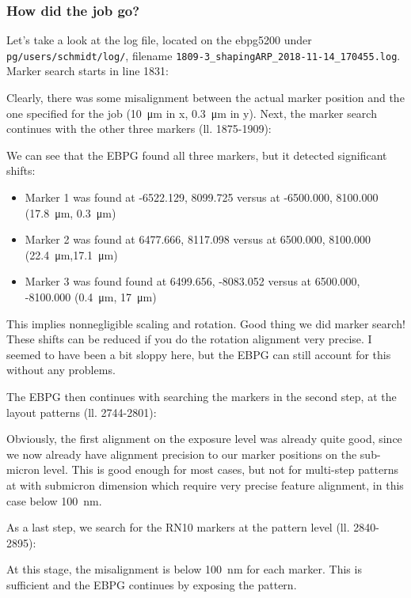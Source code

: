 \subsubsection{How did the job go?}
Let's take a look at the log file, located on the ebpg5200 under \texttt{pg/users/schmidt/log/}, filename \texttt{1809-3\_shapingARP\_2018-11-14\_170455.log}.
%
Marker search starts in line 1831:
%

%
Clearly, there was some misalignment between the actual marker position and the one specified for the job (\SI{10}{\micro\meter} in x, \SI{0.3}{\micro\meter} in y).
%
Next, the marker search continues with the other three markers (ll. 1875-1909):
%

%
We can see that the EBPG found all three markers, but it detected significant shifts:
\begin{itemize}
	\item Marker 1 was found at -6522.129, 8099.725 versus at -6500.000, 8100.000 (\SI{17.8}{\micro\meter}, \SI{0.3}{\micro\meter})
	\item Marker 2 was found at 6477.666, 8117.098 versus at 6500.000, 8100.000 (\SI{22.4}{\micro\meter},\SI{17.1}{\micro\meter})
	\item Marker 3 was found found at 6499.656, -8083.052 versus at 6500.000, -8100.000 (\SI{0.4}{\micro\meter}, \SI{17}{\micro\meter})
\end{itemize}
This implies nonnegligible scaling and rotation.
%
Good thing we did marker search! 
%
These shifts can be reduced if you do the rotation alignment very precise. 
%
I seemed to have been a bit sloppy here, but the EBPG can still account for this without any problems.

The EBPG then continues with searching the markers in the second step, at the layout patterns (ll. 2744-2801):
%

%
Obviously, the first alignment on the exposure level was already quite good, since we now already have alignment precision to our marker positions on the sub-micron level. 
%
This is good enough for most cases, but not for multi-step patterns at with submicron dimension which require very precise feature alignment, in this case below \SI{100}{\nano\meter}.

As a last step, we search for the RN10 markers at the pattern level (ll. 2840-2895):
%

%
At this stage, the misalignment is below \SI{100}{\nano\meter} for each marker. 
%
This is sufficient and the EBPG continues by exposing the pattern.



